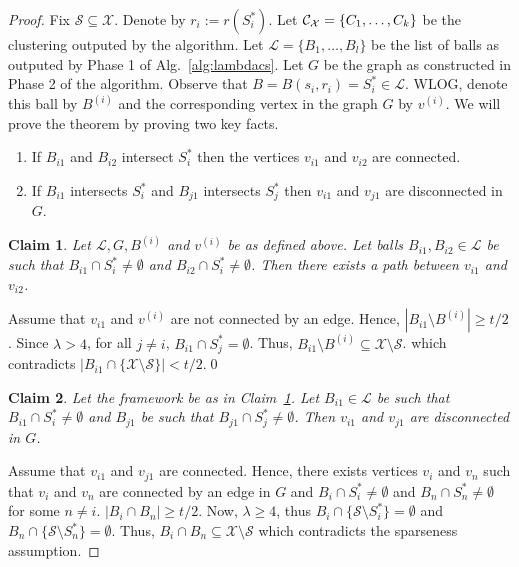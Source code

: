 \documentclass[12pt]{article}
\newtheorem{smallLemma}{Claim}
\newcommand{\mc}{\mathcal}
\renewcommand\labelitemi{$\bullet$}
\begin{document}
\begin{proof}
Fix $\mc S \subseteq \mc X$. Denote by $r_i := r(S_i^*)$. Let $\mc C_{\mc X} = \{C_1, \ldots, \\C_k\}$ be the clustering outputed by the algorithm. Let $\mc L = \{B_1, \ldots, B_l\}$ be the list of balls as outputed by Phase 1 of Alg.~\ref{alg:lambdacs}. Let $G$ be the graph as constructed in Phase 2 of the algorithm. Observe that $B = B(s_i, r_i) = S_i^* \in \mc L$. WLOG, denote this ball by $B^{(i)}$ and the corresponding vertex in the graph $G$ by $v^{(i)}$. We will prove the theorem by proving two key facts.  

\begin{enumerate}[nolistsep,noitemsep,label=\textbf{F.\arabic*},leftmargin=0.3in]
\renewcommand\labelitemi{$\diamond$}
\item \label{fact:lambda1} If $B_{i1}$ and $B_{i2}$ intersect $S_i^*$ then the vertices $v_{i1}$ and $v_{i2}$ are connected.
\item \label{fact:lambda2} If $B_{i1}$ intersects $S_i^*$ and $B_{j1}$ intersects $S_j^*$ then $v_{i1}$ and $v_{j1}$ are disconnected in $G$.	
\end{enumerate}

\vspace{-0.1in}
\begin{smallLemma}
\label{claim:lambda1}
Let $\mc L, G, B^{(i)}$ and $v^{(i)}$ be as defined above. Let balls $B_{i1}, B_{i2} \in \mc L$ be such that $B_{i1} \cap S_i^* \neq \emptyset$ and $B_{i2} \cap S_i^* \neq \emptyset$. Then there exists a path between $v_{i1}$ and $v_{i2}$.
\end{smallLemma}
\vspace{-0.1in} Assume that $v_{i1}$ and $v^{(i)}$ are not connected by an edge. Hence, $|B_{i1} \setminus B^{(i)}| \ge t/2$. Since $\lambda > 4$, for all $j \neq i$, $B_{i1} \cap S_j^* = \emptyset$. Thus, $B_{i1} \setminus B^{(i)} \subseteq \mc X \setminus \mc S$. which contradicts $|B_{i1} \cap \{\mc X \setminus \mc S\}| < t/2$.\qed

\begin{smallLemma}
Let the framework be as in Claim~\ref{claim:lambda1}. Let $B_{i1} \in \mc L$ be such that $B_{i1} \cap S_i^* \neq \emptyset$ and $B_{j1}$ be such that $B_{j1} \cap S_j^* \neq \emptyset$. Then $v_{i1}$ and $v_{j1}$ are disconnected in $G$.
\end{smallLemma}
\vspace{-0.1in} Assume that $v_{i1}$ and $v_{j1}$ are connected. Hence, there exists vertices $v_{i}$ and $v_{n}$ such that $v_i$ and $v_n$ are connected by an edge in $G$ and $B_i \cap S_i^* \neq \emptyset$ and $B_n \cap S_n^* \neq \emptyset$ for some $n \neq i$. $|B_i \cap B_n| \ge t/2$. Now, $\lambda \ge 4$, thus $B_i \cap \{\mc S \setminus S_i^*\} = \emptyset$ and $B_n \cap \{\mc S\setminus S_n^*\} = \emptyset$. Thus, $B_i \cap B_n \subseteq \mc X \setminus \mc S$ which contradicts the sparseness assumption.
\end{proof}
\end{document}
